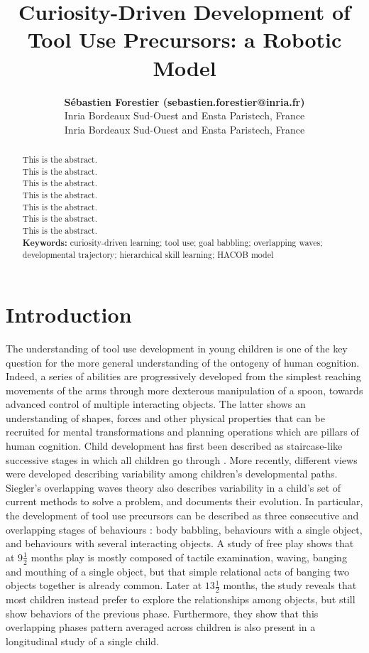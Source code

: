 \documentclass[10pt,letterpaper]{article}
\title{Curiosity-Driven Development of Tool Use Precursors: a Robotic Model}
\author{{\large \bf S\'ebastien Forestier (sebastien.forestier@inria.fr)} \\
	Inria Bordeaux Sud-Ouest and Ensta Paristech, France
  \AND {\large \bf Pierre-Yves Oudeyer (pierre-yves.oudeyer@inria.fr)} \\
	Inria Bordeaux Sud-Ouest and Ensta Paristech, France}
\begin{document}
\maketitle


\begin{abstract}
This is the abstract.\\
This is the abstract.\\
This is the abstract.\\
This is the abstract.\\
This is the abstract.\\
This is the abstract.\\
This is the abstract.\\

\textbf{Keywords:} 
curiosity-driven learning; tool use; goal babbling; overlapping waves; developmental trajectory; hierarchical skill learning; HACOB model
\end{abstract}


\section{Introduction}

	
	The understanding of tool use development in young children is one of the key question for the more general understanding of the ontogeny of human cognition.
	Indeed, a series of abilities are progressively developed from the simplest reaching movements of the arms through more dexterous manipulation of a spoon, towards advanced control of multiple interacting objects.
	The latter shows an understanding of shapes, forces and other physical properties that can be recruited for mental transformations and planning operations which are pillars of human cognition.
	Child development has first been described as staircase-like successive stages in which all children go through \cite{piaget1952origins}.
	More recently, different views were developed describing variability among children's developmental paths. 
	Siegler's overlapping waves theory \cite{siegler1996emerging} also describes variability in a child's set of current methods to solve a problem, and documents their evolution. 
	In particular, the development of tool use precursors can be described as three consecutive and overlapping stages of behaviours \cite{guerin2013survey}: 
	body babbling, behaviours with a single object, and behaviours with several interacting objects.
	A study of free play \cite{Zelazo198095} shows that at $9\frac{1}{2}$ months play is mostly composed of tactile examination, waving, banging and mouthing of a single object, 
	but that simple relational acts of banging two objects together is already common.
	Later at $13\frac{1}{2}$ months, the study reveals that most children instead prefer to explore the relationships
	among objects, but still show behaviors of the previous phase. 
	Furthermore, they show that this overlapping phases pattern averaged across children is also present in a longitudinal study of a single child.
	
\end{document}
